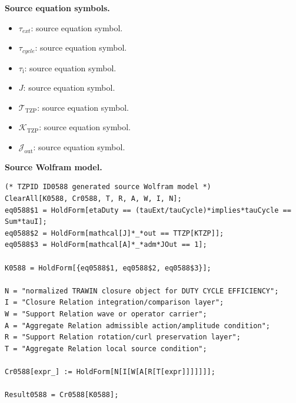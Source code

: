\begin{minipage}[t]{0.49\linewidth}
\begingroup
\small
\raggedright
\textbf{Source equation symbols.}\par
\begin{itemize}[leftmargin=1.35em,itemsep=1pt,topsep=1pt,parsep=0pt]
    \item $\tau_{ext}$: source equation symbol.
    \item $\tau_{cycle}$: source equation symbol.
    \item $\tau_{\mathrm{i}}$: source equation symbol.
    \item $J$: source equation symbol.
    \item $\mathcal{T}_{\mathrm{TZP}}$: source equation symbol.
    \item $\mathcal{K}_{\mathrm{TZP}}$: source equation symbol.
    \item $\mathcal{J}_{\mathrm{out}}$: source equation symbol.
\end{itemize}
\endgroup
\end{minipage}\hfill
\begin{minipage}[t]{0.47\linewidth}
\begingroup
\scriptsize
\raggedright
\textbf{Source Wolfram model.}\par
\begin{Verbatim}[fontsize=\tiny,breaklines=true,breakanywhere=true]
(* TZPID ID0588 generated source Wolfram model *)
ClearAll[K0588, Cr0588, T, R, A, W, I, N];
eq0588$1 = HoldForm[etaDuty == (tauExt/tauCycle)*implies*tauCycle == Sum*tauI];
eq0588$2 = HoldForm[mathcal[J]*_*out == TTZP[KTZP]];
eq0588$3 = HoldForm[mathcal[A]*_*adm*JOut == 1];

K0588 = HoldForm[{eq0588$1, eq0588$2, eq0588$3}];

N = "normalized TRAWIN closure object for DUTY CYCLE EFFICIENCY";
I = "Closure Relation integration/comparison layer";
W = "Support Relation wave or operator carrier";
A = "Aggregate Relation admissible action/amplitude condition";
R = "Support Relation rotation/curl preservation layer";
T = "Aggregate Relation local source condition";

Cr0588[expr_] := HoldForm[N[I[W[A[R[T[expr]]]]]]];

Result0588 = Cr0588[K0588];
\end{Verbatim}
\endgroup
\end{minipage}

